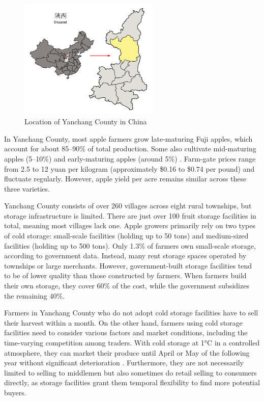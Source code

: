 \documentclass[12pt]{article}
\begin{document}
\begin{figure}[thp]
\centering
\includegraphics[width=0.6\textwidth]{figures/yanchang_map.png}
\caption{Location of Yanchang County in China}
\label{Figure: Yanchang}
\end{figure}

In Yanchang County, most apple farmers grow late-maturing Fuji apples, which account for about 85–90\% of total production. Some also cultivate mid-maturing apples (5–10\%) and early-maturing apples (around 5\%) \citep{yanchang2023}. Farm-gate prices range from 2.5 to 12 yuan per kilogram (approximately \$0.16 to \$0.74 per pound) and fluctuate regularly. However, apple yield per acre remains similar across these three varieties.

Yanchang County consists of over 260 villages across eight rural townships, but storage infrastructure is limited. There are just over 100 fruit storage facilities in total, meaning most villages lack one. Apple growers primarily rely on two types of cold storage: small-scale facilities (holding up to 50 tons) and medium-sized facilities (holding up to 500 tons). Only 1.3\% of farmers own small-scale storage, according to government data. Instead, many rent storage spaces operated by townships or large merchants. However, government-built storage facilities tend to be of lower quality than those constructed by farmers. When farmers build their own storage, they cover 60\% of the cost, while the government subsidizes the remaining 40\%.

Farmers in Yanchang County who do not adopt cold storage facilities have to sell their harvest within a month. On the other hand, farmers using cold storage facilities need to consider various factors and market conditions, including the time-varying competition among traders. With cold storage at 1°C in a controlled atmosphere, they can market their produce until April or May of the following year without significant deterioration \citep{Varela2005Shelf-life, Echeverría2004Relationships}. Furthermore, they are not necessarily limited to selling to middlemen but also sometimes do retail selling to consumers directly, as storage facilities grant them temporal flexibility to find more potential buyers.
\end{document}
